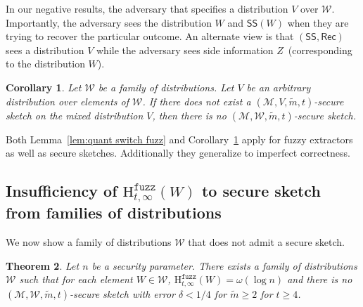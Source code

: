 \documentclass[11pt]{article}
\newcommand{\corref}[1]{\mbox{Corollary~\ref{#1}}}
\newcommand{\lemref}[1]{\mbox{Lemma~\ref{#1}}}
\newcommand{\class}[1]{{\ensuremath{\mathsf{#1}}}}
\newcommand{\sketch}{\ensuremath{\class{SS}}\xspace}
\newcommand{\rec}{\ensuremath{\class{Rec}}\xspace}
\newcommand{\Hfuzz}{\mathrm{H}^{\mathtt{fuzz}}_{t,\infty}}
\newtheorem{theorem}{Theorem}[section]
\newtheorem{corollary}[theorem]{Corollary}
\begin{document}
In our negative results, the adversary that specifies a distribution $V$ over $\mathcal{W}$.  Importantly, the adversary sees the distribution $W$ and $\sketch(W)$ when they are trying to recover the particular outcome.  An alternate view is that $(\sketch, \rec)$ sees a distribution $V$ while the adversary sees side information $Z$~(corresponding to the distribution $W$).

\begin{corollary}
\label{cor:no fuzz for dist}
Let $\mathcal{W}$ be a family of distributions.  Let $V$ be an arbitrary distribution over elements of $\mathcal{W}$.  If there does not exist a $(\mathcal{M}, V, \tilde{m}, t)$-secure sketch on the mixed distribution $V$, then there is no $(\mathcal{M}, \mathcal{W}, \tilde{m}, t)$-secure sketch.
\end{corollary}

Both \lemref{lem:quant switch fuzz} and \corref{cor:no fuzz for dist} apply for fuzzy extractors as well as secure sketches.  Additionally they generalize to imperfect correctness.

\subsection{Insufficiency of $\Hfuzz(W)$ to secure sketch from families of distributions}
We now show a family of distributions $\mathcal{W}$ that does not admit a secure sketch.  

\begin{theorem}
\label{thm:imposs sketch}
Let $n$ be a security parameter.  There exists a family of distributions $\mathcal{W}$ such that for each element $W\in \mathcal{W}$, $\Hfuzz(W)= \omega(\log n)$ and there is no $(\mathcal{M}, \mathcal{W}, \tilde{m}, t)$-secure sketch with error $\delta < 1/4$ for $\tilde{m} \ge 2$ for $t\ge 4$.  
\end{theorem}
\end{document}
